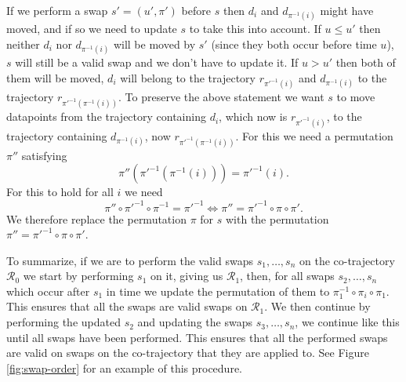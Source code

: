 \documentclass[12pt]{article}
\newcommand{\data}{d}
\newcommand{\traj}{r}
\newcommand{\cotraj}{\mathcal{R}}
\newcommand{\swap}{s}
\newcommand{\swaptime}{u}
\theoremstyle{definition}
\begin{document}
If we perform a swap \(\swap' = (\swaptime', \pi')\) before \(\swap\)
then \(\data_{i}\) and \(\data_{\pi^{-1}(i)}\) might have moved, and
if so we need to update \(\swap\) to take this into account. If
\(\swaptime \leq \swaptime'\) then neither \(\data_{i}\) nor
\(\data_{\pi^{-1}(i)}\) will be moved by \(\swap'\) (since they both
occur before time \(\swaptime\)), \(\swap\) will still be a valid swap
and we don't have to update it. If \(\swaptime > \swaptime'\) then
both of them will be moved, \(\data_{i}\) will belong to the
trajectory \(\traj_{\pi'^{-1}(i)}\) and \(\data_{\pi^{-1}(i)}\) to the
trajectory \(\traj_{\pi'^{-1}(\pi^{-1}(i))}\). To preserve the above
statement we want \(\swap\) to move datapoints from the trajectory
containing \(\data_{i}\), which now is \(\traj_{\pi'^{-1}(i)}\), to
the trajectory containing \(\data_{\pi^{-1}(i)}\), now
\(\traj_{\pi'^{-1}(\pi^{-1}(i))}\). For this we need a permutation
\(\pi''\) satisfying
\begin{equation*}
  \pi''(\pi'^{-1}(\pi^{-1}(i))) = \pi'^{-1}(i).
\end{equation*}
For this to hold for all \(i\) we need
\begin{equation}
  \label{eq:swap-update}
  \pi'' \circ \pi'^{-1} \circ \pi^{-1} = \pi'^{-1}
  \iff \pi'' = \pi'^{-1} \circ \pi \circ \pi'.
\end{equation}
We therefore replace the permutation \(\pi\) for \(\swap\) with the
permutation \(\pi'' = \pi'^{-1} \circ \pi \circ \pi'\).

To summarize, if we are to perform the valid swaps
\(\swap_{1}, \dots, \swap_{n}\) on the co-trajectory \(\cotraj_{0}\)
we start by performing \(\swap_{1}\) on it, giving us \(\cotraj_{1}\),
then, for all swaps \(\swap_{2}, \dots, \swap_{n}\) which occur after
\(\swap_{1}\) in time we update the permutation of them to
\(\pi_{1}^{-1} \circ \pi_{i} \circ \pi_{1}\). This ensures that all
the swaps are valid swaps on \(\cotraj_{1}\). We then continue by
performing the updated \(\swap_{2}\) and updating the swaps
\(\swap_{3}, \dots, \swap_{n}\), we continue like this until all swaps
have been performed. This ensures that all the performed swaps are
valid on swaps on the co-trajectory that they are applied to. See
Figure \ref{fig:swap-order} for an example of this procedure.
\end{document}
